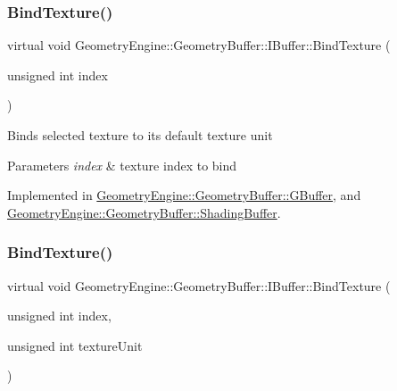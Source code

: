 \subsubsection{\texorpdfstring{BindTexture()}{BindTexture()}\hspace{0.1cm}{\footnotesize\ttfamily [1/2]}}
{\footnotesize\ttfamily virtual void Geometry\+Engine\+::\+Geometry\+Buffer\+::\+I\+Buffer\+::\+Bind\+Texture (\begin{DoxyParamCaption}\item[{unsigned int}]{index }\end{DoxyParamCaption})\hspace{0.3cm}{\ttfamily [pure virtual]}}

Binds selected texture to its default texture unit 
\begin{DoxyParams}{Parameters}
{\em index} & texture index to bind \\
\hline
\end{DoxyParams}


Implemented in \mbox{\hyperlink{class_geometry_engine_1_1_geometry_buffer_1_1_g_buffer_a2c9c631c31f0bda3c9f01c4402819e4b}{Geometry\+Engine\+::\+Geometry\+Buffer\+::\+G\+Buffer}}, and \mbox{\hyperlink{class_geometry_engine_1_1_geometry_buffer_1_1_shading_buffer_adaf685676711e22a36cd5d10b6fd7752}{Geometry\+Engine\+::\+Geometry\+Buffer\+::\+Shading\+Buffer}}.

\mbox{\label{class_geometry_engine_1_1_geometry_buffer_1_1_i_buffer_a7fdf65d272575189e26ca13d169e8317}} 
\subsubsection{\texorpdfstring{BindTexture()}{BindTexture()}\hspace{0.1cm}{\footnotesize\ttfamily [2/2]}}
{\footnotesize\ttfamily virtual void Geometry\+Engine\+::\+Geometry\+Buffer\+::\+I\+Buffer\+::\+Bind\+Texture (\begin{DoxyParamCaption}\item[{unsigned int}]{index,  }\item[{unsigned int}]{texture\+Unit }\end{DoxyParamCaption})\hspace{0.3cm}{\ttfamily [pure virtual]}}

